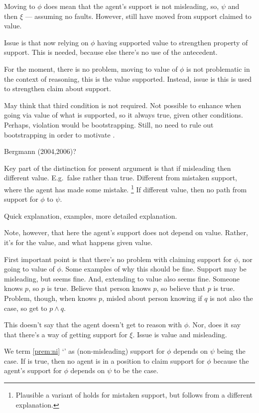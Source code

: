 \begin{note}
{  Moving to \(\phi\) does mean that the agent's support is not misleading, so, \(\psi\) and then \(\xi\) --- assuming no faults.
  However, still have moved from support claimed to value.

  Issue is that now relying on \(\phi\) having supported value to strengthen property of support.
  This is needed, because else there's no use of the antecedent.

  For the moment, there is no problem, moving to value of \(\phi\) is not problematic in the context of reasoning, this is the value supported.
  Instead, issue is this is used to strengthen claim about support.

  May think that third condition is not required.
  Not possible to enhance when going via value of what is supported, so it always true, given other conditions.
  Perhaps, violation would be bootstrapping.
  Still, no need to rule out bootstrapping in order to motivate \nI{}.

  {
    \color{red}
    Bergmann (2004,2006)?
  }
  }

  Key part of the distinction for present argument is that if misleading then different value.
  E.g.\ false rather than true.
  Different from mistaken support, where the agent has made some mistake.\nolinebreak
  \footnote{
    Plausible a variant of \nI{} holds for mistaken support, but follows from a different explanation.
  }
  If different value, then no path from support for \(\phi\) to \(\psi\).

  Quick explanation, examples, more detailed explanation.
\end{note}

\begin{note}
  Note, however, that here the agent's support does not depend on value.
  Rather, it's for the value, and what happens given value.

  
\end{note}

\begin{note}[Explaining \nI{}]
  First important point is that there's no problem with claiming support for \(\phi\), nor going to value of \(\phi\).
  Some examples of why this should be fine.
  Support may be misleading, but seems fine.
  And, extending to value also seems fine.
  Someone knows \(p\), so \(p\) is true.
  Believe that person knows \(p\), so believe that \(p\) is true.
  Problem, though, when knows \(p\), misled about person knowing if \(q\) is not also the case, so get to \(p \land q\).

  This doesn't say that the agent doesn't get to reason with \(\phi\).
  Nor, does it say that there's a way of getting support for \(\xi\).
  Issue is value and misleading.

  We term \autoref{prem:ni} `\nI{-}' as (non-misleading) support for \(\phi\) depends on \(\psi\) being the case.
  If \nI{} is true, then no agent is in a position to claim support for \(\phi\) because the agent's support for \(\phi\) depends on \(\psi\) to be the case.
\end{note}

